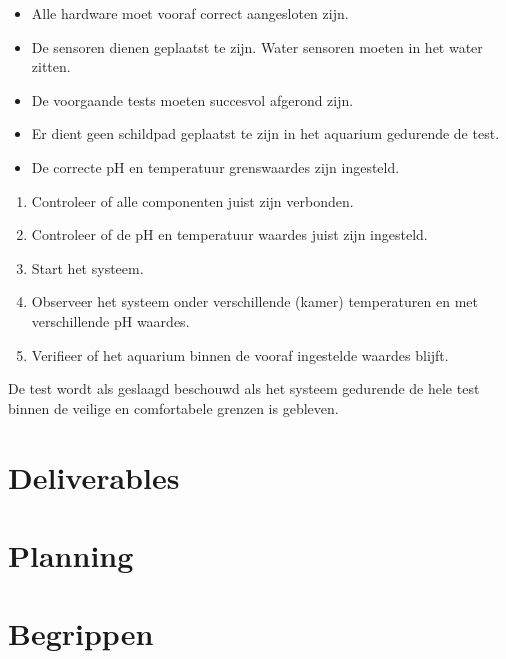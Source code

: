 \documentclass[a4paper]{report}
\begin{document}
\begin{tcolorbox}[colback=white, colframe=black, title=Test Criteria]
  \begin{itemize}
    \item Alle hardware moet vooraf correct aangesloten zijn.
    \item De sensoren dienen geplaatst te zijn. Water sensoren moeten in het water zitten.
    \item De voorgaande tests moeten succesvol afgerond zijn. 
    \item Er dient geen schildpad geplaatst te zijn in het aquarium gedurende de test.
    \item De correcte pH en temperatuur grenswaardes zijn ingesteld.
  \end{itemize}
\end{tcolorbox}

\begin{tcolorbox}[colback=white, colframe=black, title=Test Stappen]
  \begin{enumerate}
    \item Controleer of alle componenten juist zijn verbonden.
    \item Controleer of de pH en temperatuur waardes juist zijn ingesteld. 
    \item Start het systeem.
    \item Observeer het systeem onder verschillende (kamer) temperaturen en met verschillende pH waardes. 
    \item Verifieer of het aquarium binnen de vooraf ingestelde waardes blijft.
  \end{enumerate}
\end{tcolorbox}

\begin{tcolorbox}[colback=white, colframe=black, title=Slagingscriteria]
  De test wordt als geslaagd beschouwd als het systeem gedurende de hele test binnen de veilige en comfortabele grenzen is gebleven.
\end{tcolorbox}


\chapter{Deliverables}

\chapter{Planning}


\chapter{Begrippen}
\begin{acronym}
\end{acronym}
\end{document}
